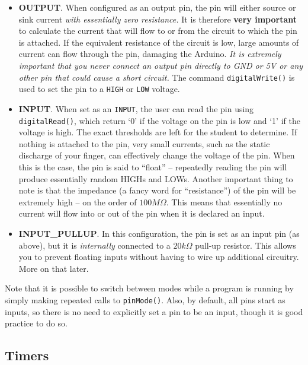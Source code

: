 \documentclass[11pt]{article} %
\begin{document}
\begin{itemize}
\item {\bf OUTPUT}. When configured as an output pin, the pin will either source or sink current \emph{with essentially zero resistance.} It is therefore {\bf very important} to calculate the current that will flow to or from the circuit to which the pin is attached. If the equivalent resistance of the circuit is low, large amounts of current can flow through the pin, damaging the Arduino. \emph{It is extremely important that you never connect an output pin directly to GND or 5V or any other pin that could cause a short circuit.} The command \verb|digitalWrite()| is used to set the pin to a \verb|HIGH| or \verb|LOW| voltage.
\item {\bf INPUT}. When set as an \verb|INPUT|, the user can read the pin using \verb|digitalRead()|, which return ‘0’ if the voltage on the pin is low and ‘1’ if the voltage is high. The exact thresholds are left for the student to determine. If nothing is attached to the pin, very small currents, such as the static discharge of your finger, can effectively change the voltage of the pin. When this is the case, the pin is said to “float” -- repeatedly reading the pin will produce essentially random HIGHs and LOWs. Another important thing to note is that the impedance (a fancy word for “resistance”) of the pin will be extremely high -- on the order of $100M\Omega$. This means that essentially no current will flow into or out of the pin when it is declared an input.
\item {\bf INPUT\_PULLUP}. In this configuration, the pin is set as an input pin (as above), but it is \emph{internally} connected to a $20k\Omega$ pull-up resistor. This allows you to prevent floating inputs without having to wire up additional circuitry. More on that later.
\end{itemize}

Note that it is possible to switch between modes while a program is running by simply making repeated calls to \verb|pinMode()|. Also, by default, all pins start as inputs, so there is no need to explicitly set a pin to be an input, though it is good practice to do so.

\subsection*{Timers}
\end{document}
